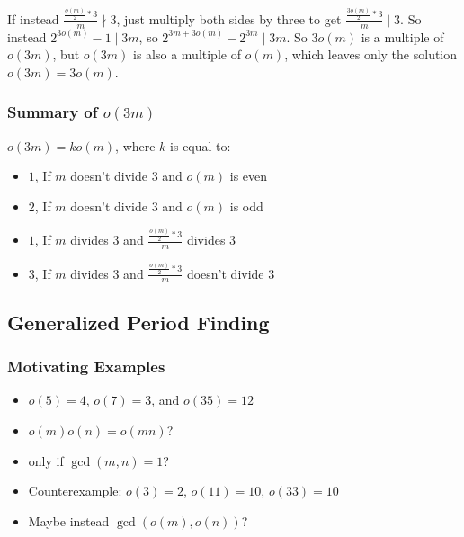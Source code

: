 \documentclass{article}
\begin{document}
  If instead $\frac{\frac{o(m)}{2} * 3}{m} \nmid 3$, just multiply both sides by three to get $\frac{\frac{3o(m)}{2} * 3}{m} \mid 3$. So instead $2^{3o(m)} - 1 \mid 3m$, so $2^{3m+3o(m)} - 2^{3m} \mid 3m$. So $3o(m)$ is a multiple of $o(3m)$, but $o(3m)$ is also a multiple of $o(m)$, which leaves only the solution $o(3m) = 3o(m)$.
  \subsubsection{Summary of $o(3m)$}
  $o(3m) = ko(m)$, where $k$ is equal to:
  \begin{itemize}
  \item $1$, If $m$ doesn't divide 3 and $o(m)$ is even
  \item $2$, If $m$ doesn't divide 3 and $o(m)$ is odd
  \item $1$, If $m$ divides 3 and $\frac{\frac{o(m)}{2} * 3}{m}$ divides 3
  \item $3$, If $m$ divides 3 and $\frac{\frac{o(m)}{2} * 3}{m}$ doesn't divide 3
  \end{itemize}
  \subsection{Generalized Period Finding}
  \subsubsection{Motivating Examples}
  \begin{itemize}
  \item $o(5) = 4$, $o(7) = 3$, and $o(35) = 12$
  \item $o(m)o(n) = o(mn)$?
  \item only if $\gcd(m, n) = 1$?
  \item Counterexample: $o(3) = 2$, $o(11) = 10$, $o(33) = 10$
  \item Maybe instead $\gcd(o(m), o(n))$? 
  \end{itemize}
\end{document}

